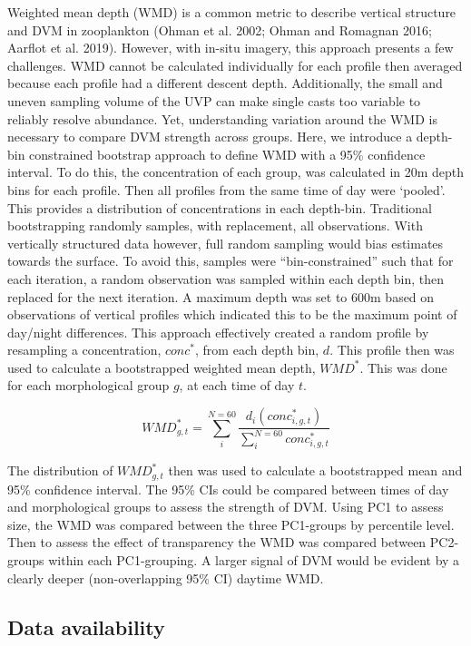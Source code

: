 \documentclass[
  letterpaper,
  DIV=11,
  numbers=noendperiod]{scrartcl}
\begin{document}
Weighted mean depth (WMD) is a common metric to describe vertical
structure and DVM in zooplankton (Ohman et al. 2002; Ohman and Romagnan
2016; Aarflot et al. 2019). However, with in-situ imagery, this approach
presents a few challenges. WMD cannot be calculated individually for
each profile then averaged because each profile had a different descent
depth. Additionally, the small and uneven sampling volume of the UVP can
make single casts too variable to reliably resolve abundance. Yet,
understanding variation around the WMD is necessary to compare DVM
strength across groups. Here, we introduce a depth-bin constrained
bootstrap approach to define WMD with a 95\% confidence interval. To do
this, the concentration of each group, was calculated in 20m depth bins
for each profile. Then all profiles from the same time of day were
`pooled'. This provides a distribution of concentrations in each
depth-bin. Traditional bootstrapping randomly samples, with replacement,
all observations. With vertically structured data however, full random
sampling would bias estimates towards the surface. To avoid this,
samples were ``bin-constrained'' such that for each iteration, a random
observation was sampled within each depth bin, then replaced for the
next iteration. A maximum depth was set to 600m based on observations of
vertical profiles which indicated this to be the maximum point of
day/night differences. This approach effectively created a random
profile by resampling a concentration, \(conc^*\), from each depth bin,
\(d\). This profile then was used to calculate a bootstrapped weighted
mean depth, \(WMD^*\). This was done for each morphological group \(g\),
at each time of day \(t\).

\[WMD^*_{g,t} = \sum_{i}^{N = 60}{\frac{d_i(conc^*_{i,g,t})}{\sum_i^{N = 60}{conc^*_{i,g,t}}}}\]

The distribution of \(WMD^*_{g,t}\) then was used to calculate a
bootstrapped mean and 95\% confidence interval. The 95\% CIs could be
compared between times of day and morphological groups to assess the
strength of DVM. Using PC1 to assess size, the WMD was compared between
the three PC1-groups by percentile level. Then to assess the effect of
transparency the WMD was compared between PC2-groups within each
PC1-grouping. A larger signal of DVM would be evident by a clearly
deeper (non-overlapping 95\% CI) daytime WMD.

\hypertarget{data-availability}{%
\subsection{Data availability}\label{data-availability}}
\end{document}
